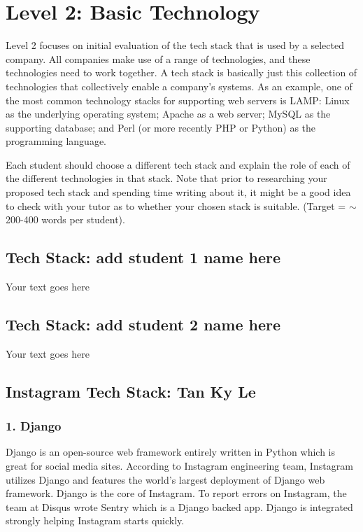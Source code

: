 \documentclass[a4paper, 11pt]{report}
\begin{document}
\newpage
\section{Level 2: Basic Technology}

Level 2 focuses on initial evaluation of the tech stack that is used by a selected company. All companies make use of a range of technologies, and these technologies need to work together. A tech stack is basically just this collection of technologies that collectively enable a company's systems. As an example, one of the most common technology stacks for supporting web servers is LAMP: Linux as the underlying operating system; Apache as a web server; MySQL as the supporting database; and Perl (or more recently PHP or Python) as the programming language.

Each student should choose a different tech stack and explain the role of each of the different technologies in that stack. Note that prior to researching your proposed tech stack and spending time writing about it, it might be a good idea to check with your tutor as to whether your chosen stack is suitable. (Target = $\sim$200-400 words per student).

\subsection{Tech Stack: add student 1 name here}

Your text goes here

\subsection{Tech Stack: add student 2 name here}

Your text goes here

\subsection{ Instagram Tech Stack: Tan Ky Le}
\subsubsection{1. Django}
 Django is an open-source web framework entirely written in Python which is great for social media sites. According to Instagram engineering team, Instagram utilizes Django and features the world’s largest deployment of Django web framework\cite{ky3}. Django is the core of Instagram. To report errors on Instagram, the team at Disqus wrote Sentry which is a Django backed app. Django is integrated strongly helping Instagram starts quickly\cite{ky4}. 
\end{document}
